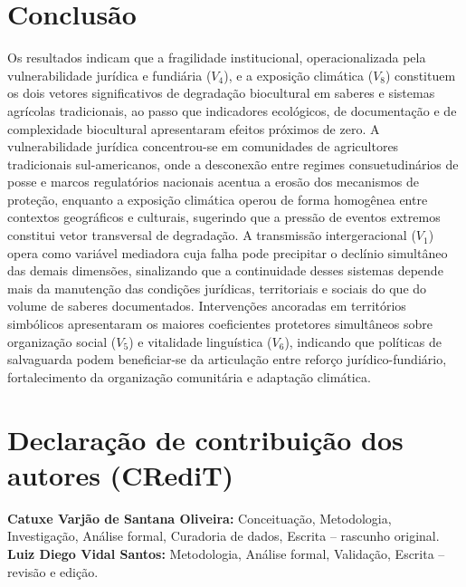 \documentclass[12pt,a4paper]{article}
\begin{document}
\section{Conclusão}
\label{sec:conclusions}

Os resultados indicam que a fragilidade institucional, operacionalizada pela vulnerabilidade jurídica e fundiária ($V_4$), e a exposição climática ($V_8$) constituem os dois vetores significativos de degradação biocultural em saberes e sistemas agrícolas tradicionais, ao passo que indicadores ecológicos, de documentação e de complexidade biocultural apresentaram efeitos próximos de zero. A vulnerabilidade jurídica concentrou-se em comunidades de agricultores tradicionais sul-americanos, onde a desconexão entre regimes consuetudinários de posse e marcos regulatórios nacionais acentua a erosão dos mecanismos de proteção, enquanto a exposição climática operou de forma homogênea entre contextos geográficos e culturais, sugerindo que a pressão de eventos extremos constitui vetor transversal de degradação. A transmissão intergeracional ($V_1$) opera como variável mediadora cuja falha pode precipitar o declínio simultâneo das demais dimensões, sinalizando que a continuidade desses sistemas depende mais da manutenção das condições jurídicas, territoriais e sociais do que do volume de saberes documentados. Intervenções ancoradas em territórios simbólicos apresentaram os maiores coeficientes protetores simultâneos sobre organização social ($V_5$) e vitalidade linguística ($V_6$), indicando que políticas de salvaguarda podem beneficiar-se da articulação entre reforço jurídico-fundiário, fortalecimento da organização comunitária e adaptação climática.

\section*{Declaração de contribuição dos autores (CRediT)}

\textbf{Catuxe Varjão de Santana Oliveira:} Conceituação, Metodologia, Investigação, Análise formal, Curadoria de dados, Escrita -- rascunho original. \textbf{Luiz Diego Vidal Santos:} Metodologia, Análise formal, Validação, Escrita -- revisão e edição.
\end{document}
